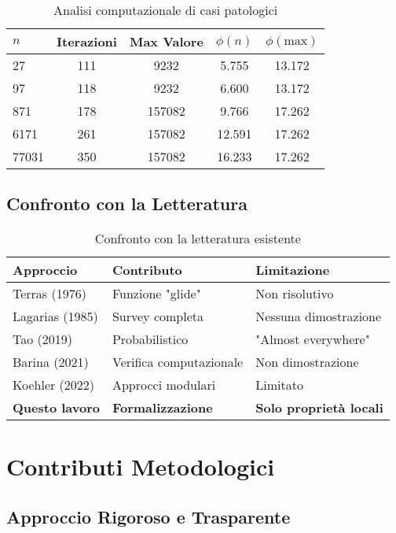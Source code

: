 \documentclass[11pt,a4paper]{article}
\begin{document}
\begin{table}[h]
\centering
\caption{Analisi computazionale di casi patologici}
\begin{tabular}{@{}lcccc@{}}
\toprule
$n$ & Iterazioni & Max Valore & $\phi(n)$ & $\phi(\text{max})$ \\
\midrule
27 & 111 & 9232 & 5.755 & 13.172 \\
97 & 118 & 9232 & 6.600 & 13.172 \\
871 & 178 & 157082 & 9.766 & 17.262 \\
6171 & 261 & 157082 & 12.591 & 17.262 \\
77031 & 350 & 157082 & 16.233 & 17.262 \\
\bottomrule
\end{tabular}
\end{table}

\subsection{Confronto con la Letteratura}

\begin{table}[h]
\centering
\begin{tabular}{lll}
\toprule
\textbf{Approccio} & \textbf{Contributo} & \textbf{Limitazione} \\
\midrule
Terras (1976) & Funzione "glide" & Non risolutivo \\
Lagarias (1985) & Survey completa & Nessuna dimostrazione \\
Tao (2019) & Probabilistico & "Almost everywhere" \\
Barina (2021) & Verifica computazionale & Non dimostrazione \\
Koehler (2022) & Approcci modulari & Limitato \\
\textbf{Questo lavoro} & \textbf{Formalizzazione} & \textbf{Solo proprietà locali} \\
\bottomrule
\end{tabular}
\caption{Confronto con la letteratura esistente}
\end{table}

\section{Contributi Metodologici}

\subsection{Approccio Rigoroso e Trasparente}
\end{document}
